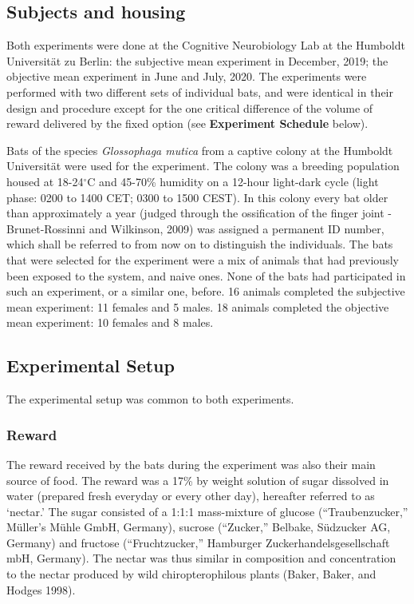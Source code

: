 \documentclass[
]{article}
\begin{document}
\hypertarget{subjects-and-housing}{%
\subsection{Subjects and housing}\label{subjects-and-housing}}

Both experiments were done at the Cognitive Neurobiology Lab at the Humboldt Universität zu Berlin: the subjective mean experiment in December, 2019; the objective mean experiment in June and July, 2020. The experiments were performed with two different sets of individual bats, and were identical in their design and procedure except for the one critical difference of the volume of reward delivered by the fixed option (see \textbf{Experiment Schedule} below).

Bats of the species \emph{Glossophaga mutica} from a captive colony at the Humboldt Universität were used for the experiment. The colony was a breeding population housed at 18-24\(^\circ\)C and 45-70\% humidity on a 12-hour light-dark cycle (light phase: 0200 to 1400 CET; 0300 to 1500 CEST). In this colony every bat older than approximately a year (judged through the ossification of the finger joint - Brunet-Rossinni and Wilkinson, 2009) was assigned a permanent ID number, which shall be referred to from now on to distinguish the individuals. The bats that were selected for the experiment were a mix of animals that had previously been exposed to the system, and naive ones. None of the bats had participated in such an experiment, or a similar one, before. 16 animals completed the subjective mean experiment: 11 females and 5 males. 18 animals completed the objective mean experiment: 10 females and 8 males.

\hypertarget{experimental-setup}{%
\subsection{Experimental Setup}\label{experimental-setup}}

The experimental setup was common to both experiments.

\hypertarget{reward}{%
\subsubsection{Reward}\label{reward}}

The reward received by the bats during the experiment was also their main source of food. The reward was a 17\% by weight solution of sugar dissolved in water (prepared fresh everyday or every other day), hereafter referred to as `nectar.' The sugar consisted of a 1:1:1 mass-mixture of glucose (``Traubenzucker,'' Müller's Mühle GmbH, Germany), sucrose (``Zucker,'' Belbake, Südzucker AG, Germany) and fructose (``Fruchtzucker,'' Hamburger Zuckerhandelsgesellschaft mbH, Germany). The nectar was thus similar in composition and concentration to the nectar produced by wild chiropterophilous plants (Baker, Baker, and Hodges 1998).
\end{document}
